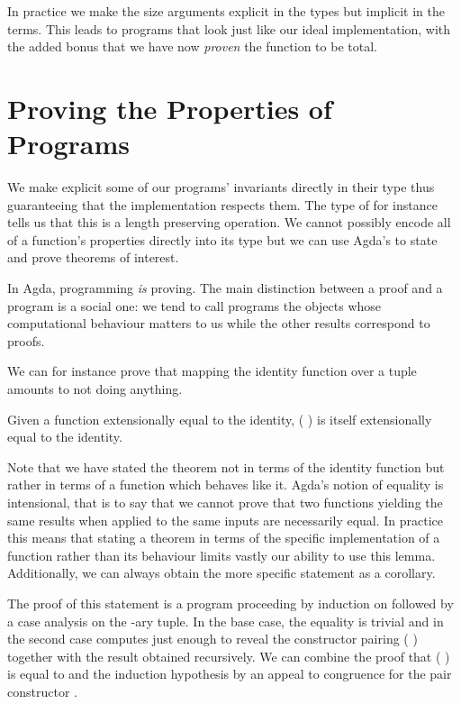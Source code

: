 In practice we make the size arguments explicit in the types but implicit in the
terms. This leads to programs that look just like our ideal implementation, with
the added bonus that we have now \emph{proven} the function to be total.


\section{Proving the Properties of Programs}

We make explicit some of our programs' invariants directly in their
type thus guaranteeing that the implementation respects them. The
type of  for instance tells us that
this is a length preserving operation. We cannot possibly encode all
of a function's properties directly into its type but we can use
Agda's to state and prove theorems of interest.

In Agda, programming \emph{is} proving. The main distinction between
a proof and a program is a social one: we tend to call programs the
objects whose computational behaviour matters to us while the other
results correspond to proofs.

We can for instance prove that mapping the identity function over a
tuple amounts to not doing anything.

\begin{lemma}
Given a function  extensionally equal to the identity,
{( )} is itself extensionally
equal to the identity.
\end{lemma}

\begin{technique} Note that we have stated
the theorem not in terms of the identity function but rather in
terms of a function which behaves like it. Agda's notion of equality
is intensional, that is to say that we cannot prove that two functions
yielding the same results when applied to the same inputs are necessarily
equal. In practice this means that stating a theorem in terms of the
specific implementation of a function rather than its behaviour limits
vastly our ability to use this lemma. Additionally, we can always
obtain the more specific statement as a corollary.
\end{technique}

The proof of this statement is a program proceeding by induction
on  followed by a case analysis on the -ary tuple.
In the base case, the equality is trivial and in the second case
 computes just enough to reveal
the constructor pairing {( )} together with the result
obtained recursively. We can combine the proof that {( )}
is equal to  and the induction hypothesis by an appeal to
congruence for the pair constructor \AIC{\_,\_}.

